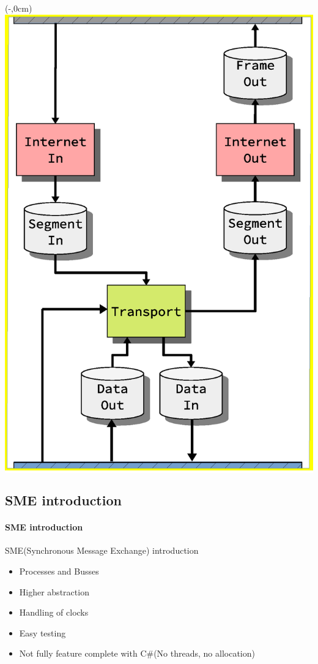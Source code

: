 \begin{frame}
    \begin{textblock*}{\displayThumbnail}(\paperwidth-\displayThumbnail-0.2cm,0cm) %
        \colorbox{white}{\includegraphics[width=\textwidth]{implementation/design_2_sme.eps}}
    \end{textblock*}
    \frametitle{\ImplementationTitle}
    \subsection{SME introduction}
    \framesubtitle{SME introduction}

    SME(Synchronous Message Exchange) introduction
    \begin{itemize}
        \item Processes and Busses
        \item Higher abstraction
        \item Handling of clocks
        \item Easy testing
        \item Not fully feature complete with C\#(No threads, no allocation)
    \end{itemize}
\end{frame}
